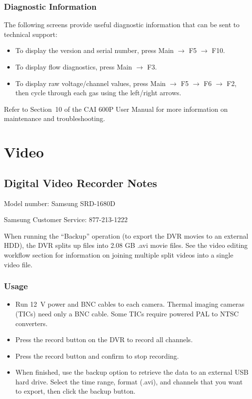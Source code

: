\documentclass[11pt,oneside]{book}
\begin{document}
\subsection{Diagnostic Information}

The following screens provide useful diagnostic information that can be sent to technical support:
\begin{itemize}
\item To display the version and serial number, press Main $\rightarrow$ F5 $\rightarrow$ F10.
\item To display flow diagnostics, press Main $\rightarrow$ F3.
\item To display raw voltage/channel values, press Main $\rightarrow$ F5 $\rightarrow$ F6 $\rightarrow$ F2, then cycle through each gas using the left/right arrows.
\end{itemize}

Refer to Section~10 of the CAI 600P User Manual for more information on maintenance and troubleshooting.


\chapter{Video}
\label{chap:Video}

\section{Digital Video Recorder Notes}

Model number: Samsung SRD-1680D

Samsung Customer Service: 877-213-1222

When running the ``Backup'' operation (to export the DVR movies to an external HDD), the DVR splits up files into 2.08 GB .avi movie files. See the video editing workflow section for information on joining multiple split videos into a single video file.

\subsection{Usage}

\begin{itemize}
\item{Run 12~V power and BNC cables to each camera. Thermal imaging cameras (TICs) need only a BNC cable. Some TICs require powered PAL to NTSC converters.}
\item{Press the record button on the DVR to record all channels.}
\item{Press the record button and confirm to stop recording.}
\item{When finished, use the backup option to retrieve the data to an external USB hard drive. Select the time range, format (.avi), and channels that you want to export, then click the backup button.}
\end{itemize}
\end{document}
